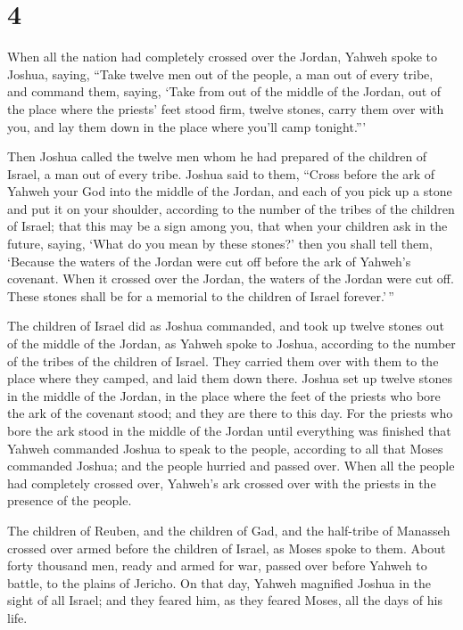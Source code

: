 \hypertarget{section-3}{%
\section{4}\label{section-3}}

 When all the nation had completely crossed over the Jordan,
Yahweh spoke to Joshua, saying,  ``Take twelve men out of
the people, a man out of every tribe,  and command them,
saying, `Take from out of the middle of the Jordan, out of the place
where the priests' feet stood firm, twelve stones, carry them over with
you, and lay them down in the place where you'll camp tonight.'''

 Then Joshua called the twelve men whom he had prepared of
the children of Israel, a man out of every tribe.  Joshua
said to them, ``Cross before the ark of Yahweh your God into the middle
of the Jordan, and each of you pick up a stone and put it on your
shoulder, according to the number of the tribes of the children of
Israel;  that this may be a sign among you, that when your
children ask in the future, saying, `What do you mean by these stones?'
 then you shall tell them, `Because the waters of the Jordan
were cut off before the ark of Yahweh's covenant. When it crossed over
the Jordan, the waters of the Jordan were cut off. These stones shall be
for a memorial to the children of Israel forever.'\,''

 The children of Israel did as Joshua commanded, and took up
twelve stones out of the middle of the Jordan, as Yahweh spoke to
Joshua, according to the number of the tribes of the children of Israel.
They carried them over with them to the place where they camped, and
laid them down there.  Joshua set up twelve stones in the
middle of the Jordan, in the place where the feet of the priests who
bore the ark of the covenant stood; and they are there to this day.
 For the priests who bore the ark stood in the middle of
the Jordan until everything was finished that Yahweh commanded Joshua to
speak to the people, according to all that Moses commanded Joshua; and
the people hurried and passed over.  When all the people
had completely crossed over, Yahweh's ark crossed over with the priests
in the presence of the people.

 The children of Reuben, and the children of Gad, and the
half-tribe of Manasseh crossed over armed before the children of Israel,
as Moses spoke to them.  About forty thousand men, ready
and armed for war, passed over before Yahweh to battle, to the plains of
Jericho.  On that day, Yahweh magnified Joshua in the sight
of all Israel; and they feared him, as they feared Moses, all the days
of his life.

